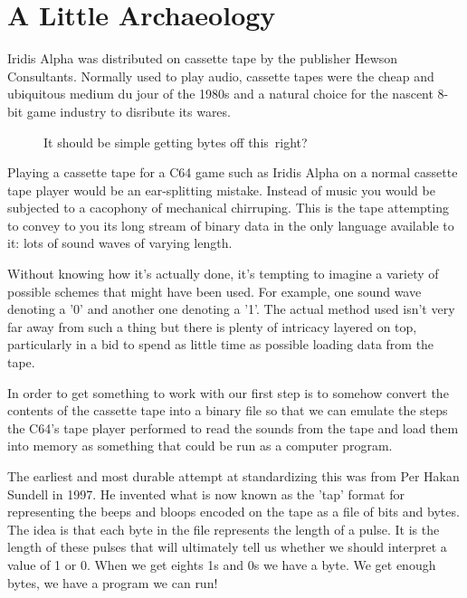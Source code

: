 \chapter{A Little Archaeology} 
\lstset{style=6502Style}

Iridis Alpha was distributed on cassette tape by the publisher Hewson Consultants. Normally used
to play audio, cassette tapes were the cheap and ubiquitous medium du jour of the 1980s and a
natural choice for the nascent 8-bit game industry to disribute its wares.

\begin{figure}[H]
  {
    \begin{adjustbox}{width=10cm,center}
    \end{adjustbox}
  }\caption[]{It should be simple getting bytes off this\, right?}
\end{figure}

Playing a cassette tape for a C64 game such as Iridis Alpha on a normal cassette tape player would
be an ear-splitting mistake. Instead of music you would be subjected to a cacophony of mechanical
chirruping. This is the tape attempting to convey to you its long stream of binary data in the only
language available to it: lots of sound waves of varying length.

Without knowing how it's actually done, it's tempting to imagine a variety of possible schemes that
might have been used. For example, one sound wave denoting a '0' and another one denoting a '1'.
The actual method used isn't very far away from such a thing but there is plenty of intricacy
layered on top, particularly in a bid to spend as little time as possible loading data from the
tape.

In order to get something to work with our first step is to somehow convert the contents of the
cassette tape into a binary file so that we can emulate the steps the C64's tape player performed
to read the sounds from the tape and load them into memory as something that could be run as a
computer program.

The earliest and most durable attempt at standardizing this was from Per Hakan Sundell in 1997. He
invented what is now known as the 'tap' format for representing the beeps and bloops encoded on the
tape as a file of bits and bytes. The idea is that each byte in the file represents the length of
a pulse. It is the length of these pulses that will ultimately tell us whether we should interpret
a value of 1 or 0. When we get eights 1s and 0s we have a byte. We get enough bytes, we have a program
we can run!


